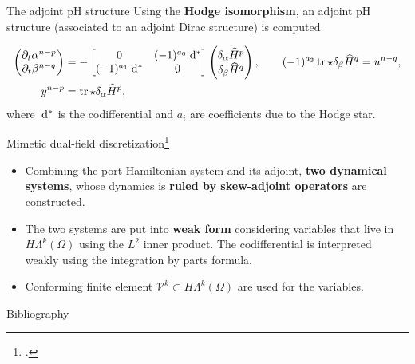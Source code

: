 \documentclass[aspectratio=169]{beamer}
\DeclareMathOperator{\tr}{tr}
\newcommand*{\dual}[1]{\ensuremath{\widehat{#1}}}
\begin{document}
\begin{frame}{The adjoint pH structure}
	Using the \textbf{Hodge isomorphism}, an adjoint pH structure (associated to an adjoint Dirac structure) is computed
	
	\begin{tcolorbox}[nobeforeafter, colframe=theme,title=Adjoint pH system]%
	\begin{equation*}
		\begin{aligned}
			\begin{pmatrix}
				\partial_t {\alpha}^{n-p} \\
				\partial_t {\beta}^{n-q} \\
			\end{pmatrix} &= -
			\begin{bmatrix}
				0 &  (-1)^{a_0}\d{}^* \\
				(-1)^{a_1}\d{}^* & 0 \\
			\end{bmatrix}
			\begin{pmatrix}
				\delta_{\alpha} \dual{H}^p \\
				\delta_{{\beta}} \dual{H}^q
			\end{pmatrix}, \qquad (-1)^{a_3}\tr \star \delta_{{\beta}} \dual{H}^q= u^{n-q}, \\
			y^{n-p} &= \tr \star \delta_{\alpha} \dual{H}^p,
		\end{aligned}
	\end{equation*}
	where $\d{}^{*}$ is the codifferential and $a_i$ are coefficients due to the Hodge star.
	\end{tcolorbox} 

\end{frame}
	
	\begin{frame}{Mimetic dual-field discretization\footcite{zhang2021mass}}
		\begin{itemize}
			\item Combining the port-Hamiltonian system and its adjoint, \textbf{two dynamical systems}, whose dynamics is \textbf{ruled by skew-adjoint operators} are constructed.
			\item The two systems are put into \textbf{weak form} considering variables that live in $H\Lambda^k(\Omega)$ using the $L^2$ inner product. The codifferential is interpreted weakly using the integration by parts formula.
			\item Conforming finite element $\mathcal{V}^k \subset H\Lambda^k(\Omega)$ are used for the variables.
		\end{itemize}
		
	\end{frame}
	


	
\begin{frame}[allowframebreaks]{Bibliography}
	\printbibliography
\end{frame}

	\appendix
	
	
	
	
\end{document}
